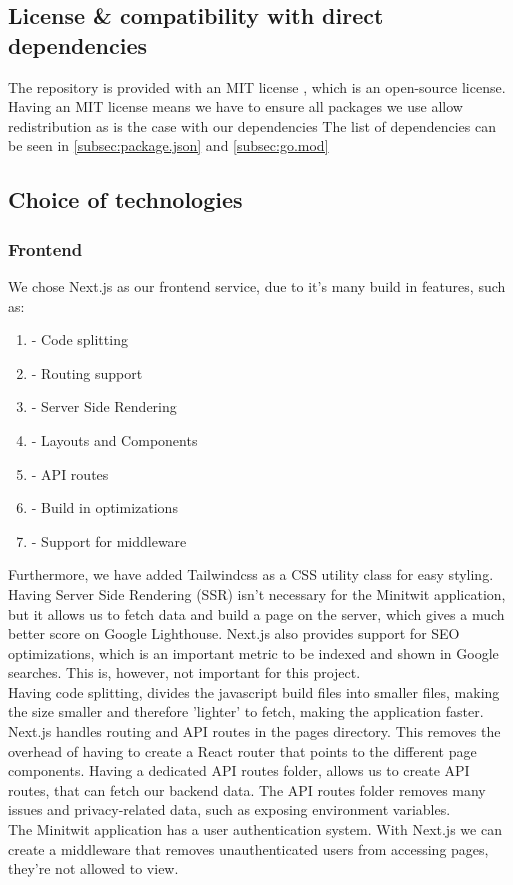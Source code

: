 \subsection{License \& compatibility with direct dependencies}
The repository is provided with an MIT license \cite{mit_license}, which is an open-source license. Having an MIT license means we have to ensure all packages we use allow redistribution as is the case with our dependencies The list of dependencies can be seen in \ref{subsec:package.json} and \ref{subsec:go.mod}

\subsection{Choice of technologies}
\subsubsection{Frontend}
We chose Next.js as our frontend service, due to it's many build in features, such as:

\begin{enumerate}
    \item - Code splitting
    \item - Routing support
    \item- Server Side Rendering
    \item- Layouts and Components
    \item- API routes
    \item- Build in optimizations
    \item- Support for middleware
\end{enumerate}
Furthermore, we have added Tailwindcss as a CSS utility class for easy styling.
Having Server Side Rendering (SSR) isn't necessary for the Minitwit application, but it allows us to fetch data and build a page on the server, which gives a much better score on Google Lighthouse. Next.js also provides support for SEO optimizations, which is an important metric to be indexed and shown in Google searches. This is, however, not important for this project.
\\
Having code splitting, divides the javascript build files into smaller files, making the size smaller and therefore 'lighter' to fetch, making the application faster.
\\
Next.js handles routing and API routes in the pages directory. This removes the overhead of having to create a React router that points to the different page components. Having a dedicated API routes folder, allows us to create API routes, that can fetch our backend data. The API routes folder removes many issues and privacy-related data, such as exposing environment variables.
\\
The Minitwit application has a user authentication system. With Next.js we can create a middleware that removes unauthenticated users from accessing pages, they're not allowed to view.
